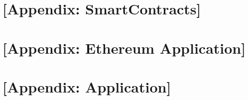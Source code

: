 

\setcounter{chapter}{0}
\renewcommand\thechapter{\Alph{chapter}}

\captionsetup[table]{list=no}
\captionsetup[figure]{list=no}

\begingroup
\renewcommand{\cleardoublepage}{}
\renewcommand{\clearpage}{}
\vspace*{-5em}

\chapter{[Appendix: SmartContracts]}
\label{ch:appendix}

\vspace*{-1em}







\chapter{[Appendix: Ethereum Application] }
\label{ch:appendixb}

\vspace*{-1em}







\chapter{[Appendix: Application]}
\label{ch:appendixc}

\vspace*{-1em}

